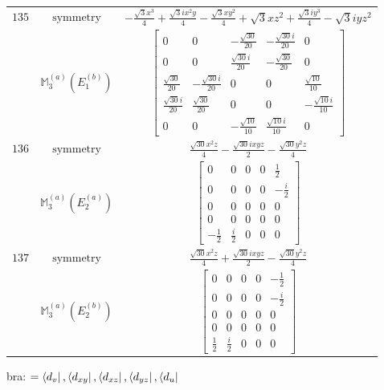 \documentclass[fleqn,8pt,landscape]{jsarticle}
\begin{document}
\begin{longtable}{ccc}
$ 135 $ & $ \text{symmetry} $ & $ - \frac{\sqrt{3} x^{3}}{4} + \frac{\sqrt{3} i x^{2} y}{4} - \frac{\sqrt{3} x y^{2}}{4} + \sqrt{3} x z^{2} + \frac{\sqrt{3} i y^{3}}{4} - \sqrt{3} i y z^{2} $ \\
$  $ & $ \mathbb{M}_{3}^{(a)}(E_{1}^{(b)}) $ & $ \begin{bmatrix} 0 & 0 & - \frac{\sqrt{30}}{20} & - \frac{\sqrt{30} i}{20} & 0 \\ 0 & 0 & \frac{\sqrt{30} i}{20} & - \frac{\sqrt{30}}{20} & 0 \\ \frac{\sqrt{30}}{20} & - \frac{\sqrt{30} i}{20} & 0 & 0 & \frac{\sqrt{10}}{10} \\ \frac{\sqrt{30} i}{20} & \frac{\sqrt{30}}{20} & 0 & 0 & - \frac{\sqrt{10} i}{10} \\ 0 & 0 & - \frac{\sqrt{10}}{10} & \frac{\sqrt{10} i}{10} & 0 \end{bmatrix} $ \\ \hline
$ 136 $ & $ \text{symmetry} $ & $ \frac{\sqrt{30} x^{2} z}{4} - \frac{\sqrt{30} i x y z}{2} - \frac{\sqrt{30} y^{2} z}{4} $ \\
$  $ & $ \mathbb{M}_{3}^{(a)}(E_{2}^{(a)}) $ & $ \begin{bmatrix} 0 & 0 & 0 & 0 & \frac{1}{2} \\ 0 & 0 & 0 & 0 & - \frac{i}{2} \\ 0 & 0 & 0 & 0 & 0 \\ 0 & 0 & 0 & 0 & 0 \\ - \frac{1}{2} & \frac{i}{2} & 0 & 0 & 0 \end{bmatrix} $ \\ \hline
$ 137 $ & $ \text{symmetry} $ & $ \frac{\sqrt{30} x^{2} z}{4} + \frac{\sqrt{30} i x y z}{2} - \frac{\sqrt{30} y^{2} z}{4} $ \\
$  $ & $ \mathbb{M}_{3}^{(a)}(E_{2}^{(b)}) $ & $ \begin{bmatrix} 0 & 0 & 0 & 0 & - \frac{1}{2} \\ 0 & 0 & 0 & 0 & - \frac{i}{2} \\ 0 & 0 & 0 & 0 & 0 \\ 0 & 0 & 0 & 0 & 0 \\ \frac{1}{2} & \frac{i}{2} & 0 & 0 & 0 \end{bmatrix} $ \\ \hline
\end{longtable}
bra: $=\bra{d_{v}}, \bra{d_{xy}}, \bra{d_{xz}}, \bra{d_{yz}}, \bra{d_{u}}$
\end{document}
